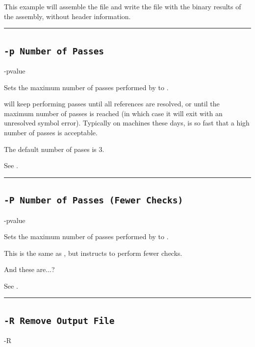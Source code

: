This example will assemble the file  and write the file  with the binary results of the assembly, without header information.\\


\hrule
\subsection{\texttt{-p Number of Passes}}
\label{flag:passes}
\begin{usage}
-pvalue
\end{usage}

Sets the maximum number of passes performed by \dasm to .

\dasm will keep performing passes until all references are resolved, or until the maximum number of passes is reached (in which case it will exit with an unresolved symbol error). Typically on machines these days, \dasm is so fast that a high number of passes is acceptable.

\label{changelog:20200824passes}
The default number of pases is 3.

See .\\

\hrule
\subsection{\texttt{-P Number of Passes (Fewer Checks)}}
\label{flag:passes2}

\begin{usage}
-pvalue
\end{usage}

Sets the maximum number of passes performed by \dasm to .

This is the same as , but instructs \dasm to perform fewer checks.

\label{todo}
{\color{red}And these are...?}

See .\\

\hrule


\subsection{\texttt{-R Remove Output File}}
\label{flag:remove}
\begin{usage}
-R
\end{usage}

